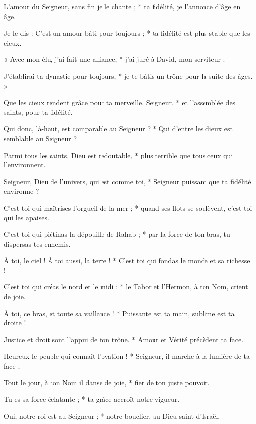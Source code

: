 \item L'amour du Seigneur, sans fin je le chante ; * ta fidélité, je l'annonce d'âge en âge.
\item Je le dis : C'est un amour bâti pour toujours ; * ta fidélité est plus stable que les cieux.
\item « Avec mon élu, j'ai fait une alliance, * j'ai juré à David, mon serviteur :
\item J'établirai ta dynastie pour toujours, * je te bâtis un trône pour la suite des âges. »
\item Que les cieux rendent grâce pour ta merveille, Seigneur, * et l'assemblée des saints, pour ta fidélité.
\item Qui donc, là-haut, est comparable au Seigneur ? * Qui d'entre les dieux est semblable au Seigneur ?
\item Parmi tous les saints, Dieu est redoutable, * plus terrible que tous ceux qui l'environnent.
\item Seigneur, Dieu de l'univers, qui est comme toi, * Seigneur puissant que ta fidélité environne ?
\item C'est toi qui maîtrises l'orgueil de la mer ; * quand ses flots se soulèvent, c'est toi qui les apaises.
\item C'est toi qui piétinas la dépouille de Rahab ; * par la force de ton bras, tu dispersas tes ennemis.
\item À toi, le ciel ! À toi aussi, la terre ! * C'est toi qui fondas le monde et sa richesse !
\item C'est toi qui créas le nord et le midi : * le Tabor et l'Hermon, à ton Nom, crient de joie.
\item À toi, ce bras, et toute sa vaillance ! * Puissante est ta main, sublime est ta droite !
\item Justice et droit sont l'appui de ton trône. * Amour et Vérité précèdent ta face.
\item Heureux le peuple qui connaît l'ovation ! * Seigneur, il marche à la lumière de ta face ;
\item Tout le jour, à ton Nom il danse de joie, * fier de ton juste pouvoir.
\item Tu es sa force éclatante ; * ta grâce accroît notre vigueur.
\item Oui, notre roi est au Seigneur ; * notre bouclier, au Dieu saint d'Israël.
